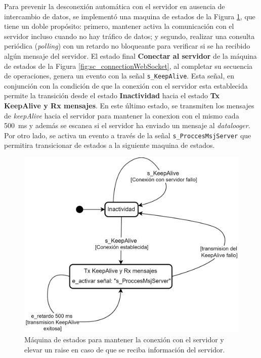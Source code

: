 Para prevenir la desconexión automática con el servidor en ausencia de intercambio de datos, se implementó una maquina de estados de la Figura \ref{fig:sc_keepAlive}, que tiene un doble propósito: primero, mantener activa la comunicación con el servidor incluso cuando no hay tráfico de datos; y segundo, realizar una consulta periódica (\textit{polling}) con un retardo no bloqueante para verificar si se ha recibido algún mensaje del servidor. El estado final \textbf{Conectar al servidor} de la máquina de estados de la Figura \ref{fig:sc_connectionWebSocket}, al completar su secuencia de operaciones, genera un evento con la señal \texttt{s\_KeepAlive}. Esta señal, en conjunción con la condición de que la conexión con el servidor esta establecida permite la transición desde el estado \textbf{Inactividad} hacia el estado \textbf{Tx KeepAlive y Rx mensajes}. En este último estado, se transmiten los mensajes de \textit{keepAlive} hacia el servidor para mantener la conexion con el mismo cada \SI{500}{\milli\second} y además se escanea si el servidor ha enviado un mensaje al \textit{datalooger}. Por otro lado, se activa un evento a través de la señal \texttt{s\_ProccesMsjServer} que permitira transicionar de estados a la siguiente maquina de estados.




\begin{figure}[H]
    \centering
    \includegraphics[width=0.7\linewidth]{Figuras/datalogger/Firmware/sc_keepAlive.png}
    \caption{Máquina de estados para mantener la conexión con el servidor y elevar un raise en caso de que se reciba información del servidor.}
    \label{fig:sc_keepAlive}
\end{figure}


